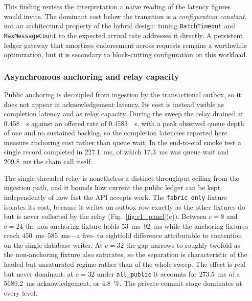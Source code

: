 \documentclass[final,5p,times,twocolumn]{elsarticle}
\begin{document}
This finding revises the interpretation a naive reading of the latency figures
would invite. The dominant cost below the transition is a \emph{configuration
constant}, not an architectural property of the hybrid design: tuning
\texttt{BatchTimeout} and \texttt{MaxMessageCount} to the expected arrival rate
addresses it directly. A persistent ledger gateway that amortizes endorsement
across requests remains a worthwhile optimization, but it is secondary to
block-cutting configuration on this workload.

\subsubsection*{\textbf{Asynchronous anchoring and relay capacity}}
Public anchoring is decoupled from ingestion by the transactional outbox, so it
does not appear in acknowledgement latency. Its cost is instead visible as
completion latency and as relay capacity. During the sweep the relay drained at
\SI{0.458}{\per\second} against an offered rate of \SI{0.4583}{\per\second},
with a peak observed queue depth of one and no sustained backlog, so the
completion latencies reported here measure anchoring cost rather than queue
wait. In the end-to-end smoke test a single record completed in
\SI{227.1}{\milli\second}, of which \SI{17.3}{\milli\second} was queue wait and
\SI{209.8}{\milli\second} the chain call itself.

The single-threaded relay is nonetheless a distinct throughput ceiling from the
ingestion path, and it bounds how current the public ledger can be kept
independently of how fast the API accepts work. The \texttt{fabric\_only}
fixture isolates its cost, because it writes an outbox row exactly as the other
fixtures do but is never collected by the relay
(Fig.~\ref{fig:c1_panel}(c)). Between $c=8$ and $c=24$ the non-anchoring fixture
holds \SIrange{53}{92}{\milli\second} while the anchoring fixtures reach
\SIrange{450}{585}{\milli\second}---a five- to eightfold difference attributable
to contention on the single database writer. At $c=32$ the gap narrows to
roughly twofold as the non-anchoring fixture also saturates, so the separation
is characteristic of the loaded but unsaturated regime rather than of the whole
sweep. The effect is real but never dominant: at $c=32$ under
\texttt{all\_public} it accounts for \SI{273.5}{\milli\second} of a
\SI{5689.2}{\milli\second} acknowledgement, or \SI{4.8}{\percent}. The
private-commit stage dominates at every level.
\end{document}
